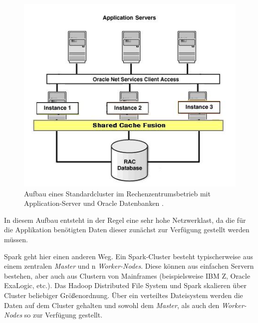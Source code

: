 \begin{figure}[htb!]
\centering
\includegraphics[width=1.0\textwidth]{bilder/oracle_cluster.jpg}
\caption{Aufbau eines Standardcluster im Rechenzentrumsbetrieb mit Application-Server und Oracle Datenbanken \protect{}. }
\label{fig:sparkclustermastermitworker}
\end{figure} 

In diesem Aufbau entsteht in der Regel eine sehr hohe Netzwerklast, da die für die Applikation benötigten Daten dieser zunächst zur Verfügung gestellt werden müssen. 

Spark geht hier einen anderen Weg. Ein Spark-Cluster besteht typischerweise aus einem zentralen \textit{Master} und n \textit{Worker-Nodes}. Diese können aus einfachen Servern bestehen, aber auch aus Clustern von Mainframes (beispielsweise IBM Z, Oracle ExaLogic, etc.). Das Hadoop Distributed File System und Spark skalieren über Cluster beliebiger Größenordnung. Über ein verteiltes Dateisystem werden die Daten auf dem Cluster gehalten und sowohl dem \textit{Master}, als auch den \textit{Worker-Nodes} so zur Verfügung gestellt. 

